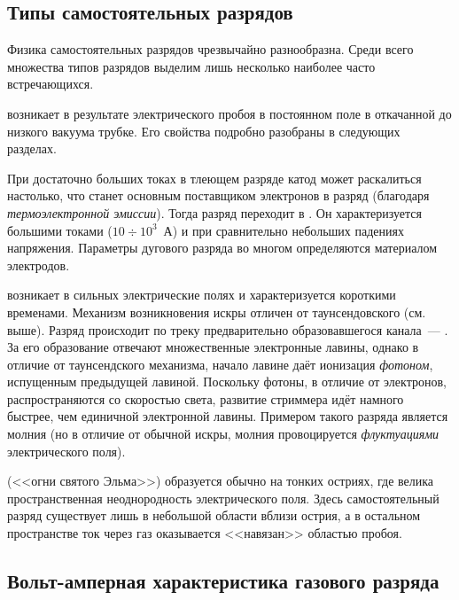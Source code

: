 

\subsection*{Типы самостоятельных разрядов}

Физика самостоятельных разрядов чрезвычайно разнообразна. Среди всего
множества типов разрядов выделим лишь несколько наиболее часто встречающихся.

 возникает в результате электрического пробоя в
постоянном поле в откачанной до низкого вакуума трубке. Его свойства
подробно разобраны в следующих разделах.

При достаточно больших токах в тлеющем разряде катод может раскалиться
настолько, что станет основным поставщиком электронов в разряд
(благодаря \emph{термоэлектронной эмиссии}). Тогда разряд
переходит в . Он характеризуется большими
токами ($10\div 10^3$~А) и при сравнительно небольших падениях
напряжения. Параметры дугового разряда во многом определяются материалом
электродов.


 возникает в сильных электрические полях
и характеризуется короткими временами. 
Механизм возникновения искры отличен от таунсендовского (см. выше).
Разряд происходит по треку предварительно образовавшегося канала~--- 
. За его образование отвечают множественные электронные лавины,
однако в отличие от таунсендского механизма, начало лавине даёт ионизация
\emph{фотоном}, испущенным предыдущей лавиной. Поскольку фотоны, в отличие
от электронов, распространяются со скоростью света, развитие стриммера идёт
намного быстрее, чем единичной электронной лавины. 
Примером такого разряда является молния (но в отличие от обычной
искры, молния провоцируется \emph{флуктуациями} электрического поля).



 (<<огни святого Эльма>>)
образуется обычно на тонких остриях, где велика пространственная
неоднородность электрического поля. Здесь самостоятельный разряд
существует лишь в небольшой области вблизи острия, а в остальном
пространстве ток через газ оказывается <<навязан>> областью пробоя.



\subsection*{Вольт-амперная характеристика газового разряда}

